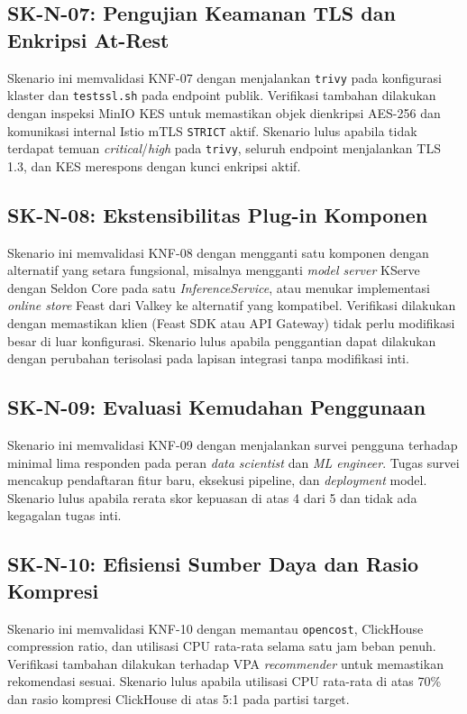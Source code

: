 \subsection{SK-N-07: Pengujian Keamanan TLS dan Enkripsi At-Rest}

Skenario ini memvalidasi KNF-07 dengan menjalankan \texttt{trivy} pada konfigurasi klaster dan \texttt{testssl.sh} pada endpoint publik. Verifikasi tambahan dilakukan dengan inspeksi MinIO KES untuk memastikan objek dienkripsi AES-256 dan komunikasi internal Istio mTLS \texttt{STRICT} aktif. Skenario lulus apabila tidak terdapat temuan \textit{critical}/\textit{high} pada \texttt{trivy}, seluruh endpoint menjalankan TLS 1.3, dan KES merespons dengan kunci enkripsi aktif.

\subsection{SK-N-08: Ekstensibilitas Plug-in Komponen}

Skenario ini memvalidasi KNF-08 dengan mengganti satu komponen dengan alternatif yang setara fungsional, misalnya mengganti \textit{model server} KServe dengan Seldon Core pada satu \textit{InferenceService}, atau menukar implementasi \textit{online store} Feast dari Valkey ke alternatif yang kompatibel. Verifikasi dilakukan dengan memastikan klien (Feast SDK atau API Gateway) tidak perlu modifikasi besar di luar konfigurasi. Skenario lulus apabila penggantian dapat dilakukan dengan perubahan terisolasi pada lapisan integrasi tanpa modifikasi inti.

\subsection{SK-N-09: Evaluasi Kemudahan Penggunaan}

Skenario ini memvalidasi KNF-09 dengan menjalankan survei pengguna terhadap minimal lima responden pada peran \textit{data scientist} dan \textit{ML engineer}. Tugas survei mencakup pendaftaran fitur baru, eksekusi pipeline, dan \textit{deployment} model. Skenario lulus apabila rerata skor kepuasan di atas 4 dari 5 dan tidak ada kegagalan tugas inti.

\subsection{SK-N-10: Efisiensi Sumber Daya dan Rasio Kompresi}

Skenario ini memvalidasi KNF-10 dengan memantau \texttt{opencost}, ClickHouse compression ratio, dan utilisasi CPU rata-rata selama satu jam beban penuh. Verifikasi tambahan dilakukan terhadap VPA \textit{recommender} untuk memastikan rekomendasi sesuai. Skenario lulus apabila utilisasi CPU rata-rata di atas 70\% dan rasio kompresi ClickHouse di atas 5:1 pada partisi target.

